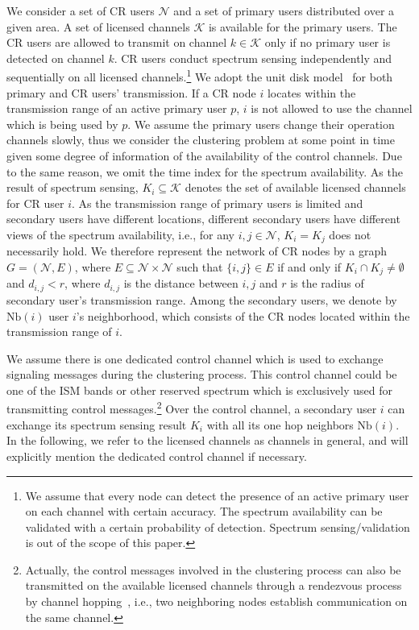 \documentclass[10pt,journal,compsoc]{IEEEtran}
\theoremstyle{mytheoremstyle}
\theoremstyle{mytheoremstyle}
\theoremstyle{mytheoremstyle}
\begin{document}
We consider a set of CR users $\mathcal{N}$ and a set of primary users distributed over a given area.
A set of licensed channels $\mathcal{K}$ is available for the primary users. 
The CR users are allowed to transmit on channel $k \in \mathcal{K}$ only if no primary user is detected on channel $k$. 
CR users conduct spectrum sensing independently and sequentially on all licensed channels.\footnote{We assume that every node can detect the presence of an active primary user on each channel with certain accuracy. The spectrum availability can be validated with a certain probability of detection. Spectrum sensing/validation is out of the scope of this paper.}
We adopt the unit disk model~\cite{unitDiskModel} for both primary and CR users' transmission.
If a CR node $i$ locates within the transmission range of an active primary user $p$, $i$ is not allowed to use the channel which is being used by $p$.
We assume the primary users change their operation channels slowly, thus we consider the clustering problem at some point in time given some degree of information of the availability of the control channels.
Due to the same reason, we omit the time index for the spectrum availability. 
As the result of spectrum sensing, $K_i \subseteq \mathcal{K}$ denotes the set of available licensed channels for CR user $i$.
As the transmission range of primary users is limited and secondary users have different locations, different secondary users have different views of the spectrum availability, i.e., for any $i, j \in \mathcal{N}$, $K_i = K_{j}$ does not necessarily hold.
We therefore represent the network of CR nodes by a graph $G = (\mathcal{N}, E)$, where $E \subseteq \mathcal{N} \times \mathcal{N}$ such that $\{i, j\} \in E$ if and only if $K_{i} \cap K_{j}\neq \emptyset$ and $d_{i,j} < r$, where $d_{i,j}$ is the distance between $i, j$ and $r$ is the radius of secondary user's transmission range. 
%
Among the secondary users, we denote by $\text{Nb}(i)$ user $i$'s neighborhood, which consists of the CR nodes located within the transmission range of $i$. 

We assume there is one dedicated control channel which is used to exchange signaling messages during the clustering process.
This control channel could be one of the ISM bands or other reserved spectrum which is exclusively used for transmitting control messages.\footnote{Actually, the control messages involved in the clustering process can also be transmitted on the available licensed channels through a rendezvous process by channel hopping~\cite{channelHopping_Rendezvous_2014, Gu_distributed_rendezvous_2014}, i.e., two neighboring nodes establish communication on the same channel.}
Over the control channel, a secondary user $i$ can exchange its spectrum sensing result $K_i$ with all its one hop neighbors $\text{Nb}(i)$.
In the following, we refer to the licensed channels as channels in general, and will explicitly mention the dedicated control channel if necessary. 
\end{document}
